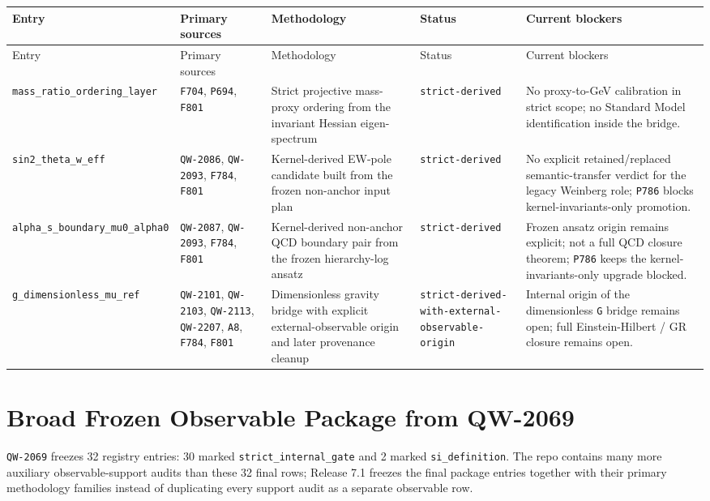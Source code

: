 \small
\begin{longtable}{@{}p{2.8cm}p{3.2cm}p{4.2cm}p{2.0cm}p{3.7cm}@{}}
\toprule
Entry & Primary sources & Methodology & Status & Current blockers \\
\midrule
\endfirsthead
\toprule
Entry & Primary sources & Methodology & Status & Current blockers \\
\midrule
\endhead
\texttt{mass\_ratio\_ordering\_layer} &
\texttt{F704}, \texttt{P694}, \texttt{F801} &
Strict projective mass-proxy ordering from the invariant Hessian eigen-spectrum &
\texttt{strict-derived} &
No proxy-to-GeV calibration in strict scope; no Standard Model identification inside the bridge. \\

\texttt{sin2\_theta\_w\_eff} &
\texttt{QW-2086}, \texttt{QW-2093}, \texttt{F784}, \texttt{F801} &
Kernel-derived EW-pole candidate built from the frozen non-anchor input plan &
\texttt{strict-derived} &
No explicit retained/replaced semantic-transfer verdict for the legacy Weinberg role; \texttt{P786} blocks kernel-invariants-only promotion. \\

\texttt{alpha\_s\_boundary\_mu0\_alpha0} &
\texttt{QW-2087}, \texttt{QW-2093}, \texttt{F784}, \texttt{F801} &
Kernel-derived non-anchor QCD boundary pair from the frozen hierarchy-log ansatz &
\texttt{strict-derived} &
Frozen ansatz origin remains explicit; not a full QCD closure theorem; \texttt{P786} keeps the kernel-invariants-only upgrade blocked. \\

\texttt{g\_dimensionless\_mu\_ref} &
\texttt{QW-2101}, \texttt{QW-2103}, \texttt{QW-2113}, \texttt{QW-2207}, \texttt{A8}, \texttt{F784}, \texttt{F801} &
Dimensionless gravity bridge with explicit external-observable origin and later provenance cleanup &
\texttt{strict-derived-with-external-observable-origin} &
Internal origin of the dimensionless \texttt{G} bridge remains open; full Einstein-Hilbert / GR closure remains open. \\
\bottomrule
\end{longtable}
\normalsize

\section{Broad Frozen Observable Package from QW-2069}

\texttt{QW-2069} freezes 32 registry entries: 30 marked
\texttt{strict\_internal\_gate} and 2 marked \texttt{si\_definition}. The
repo contains many more auxiliary observable-support audits than these 32 final
rows; Release 7.1 freezes the final package entries together with their primary
methodology families instead of duplicating every support audit as a separate
observable row.

